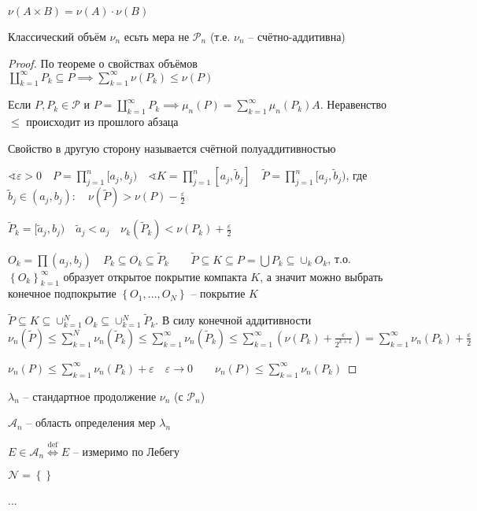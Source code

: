 \documentclass{book}
\newcommand{\tl}[1]{\widetilde{#1}}
\theoremstyle{definition}
\begin{document}
\begin{statement}
    $\nu\left( A\times B \right)  = \nu(A) \cdot \nu(B)$
\end{statement}

\begin{theorem}
    Классический объём $\nu_n$ есьть мера не  $\mathcal P_n$ (т.е.  $\nu_n$ -- счётно-аддитивна)
\end{theorem}
\begin{proof}
    По теореме о свойствах объёмов $\coprod_{k=1}^{\infty }P_k\subseteq P \implies \sum_{k=1}^{\infty } \nu(P_k) \leqslant \nu(P)$ 

    Если $P, P_k\in \mathcal P$ и  $P = \coprod_{k=1}^{\infty}P_k \implies \mu_n(P) = \sum_{k=1}^{\infty } \mu_n(P_k)A$. Неравенство $ \leqslant $ происходит из прошлого абзаца

    Свойство в другую сторону называется счётной полуаддитивностью

    $\sphericalangle \varepsilon >0\quad P = \prod_{j=1}^{n}[a_j, b_j)\quad \sphericalangle K = \prod_{j=1}^{n}[a_j, \tl b_j]\quad \tl P = \prod_{j=1}^{n}[a_j, \tl b_j)$, где $\tl b_j\in \left( a_j, b_j \right) :\quad \nu(\tl P) > \nu(P) - \frac{\varepsilon}{2}$

    $\tl P_k = [\tl a_j, b_j)\quad \tl a_j < a_j\quad \nu_k(\tl P_k) < \nu(P_k) + \frac{\varepsilon}{2}$

    $O_k = \prod (a_j, b_j)\quad P_k \subseteq  O_k \subseteq  \tl P_k\qquad \tl P \subseteq  K \subseteq  P = \bigcup P_k \subseteq \cup _kO_k $, т.о. $\left\{ O_k \right\} _{k=1}^{\infty}$ образует открытое покрытие компакта $K$, а значит можно выбрать конечное подпокрытие  $\left\{ O_1, \ldots, O_N \right\} $ -- покрытие $K$

    $\tl P \subseteq K \subseteq \cup _{k=1}^NO_k \subseteq \cup _{k=1}^{N} \tl P_k$. В силу конечной аддитивности $\nu_n(\tl P) \leqslant  \sum_{k=1}^{N} \nu_n(\tl P_k) \leqslant \sum_{k=1}^{\infty } \nu_n(\tl P_k) \leqslant \sum_{k=1}^{\infty } \left( \nu(P_k) + \frac{\varepsilon}{2^{k+1}} \right) =\sum_{k=1}^{\infty } \nu_n(P_k) + \frac{\varepsilon}{2}$ 

        $\nu_n(P) \leqslant \sum_{k=1}^{\infty } \nu_n(P_k) + \varepsilon\quad \varepsilon \to 0\qquad \nu_n(P) \leqslant \sum_{k=1}^{\infty } \nu_n(P_k)$
\end{proof}

\begin{definition}
    $\lambda_n$ -- стандартное продолжение  $\nu_n$ (с  $\mathcal P_n$)

     $\mathcal A_n$ -- область определения мер  $\lambda_n$

     $E \in \mathcal A_n \overset{\text{def}} \iff E$ -- измеримо по Лебегу

     $\mathcal N = \left\{  \right\}  $
\end{definition}
...
\end{document}
